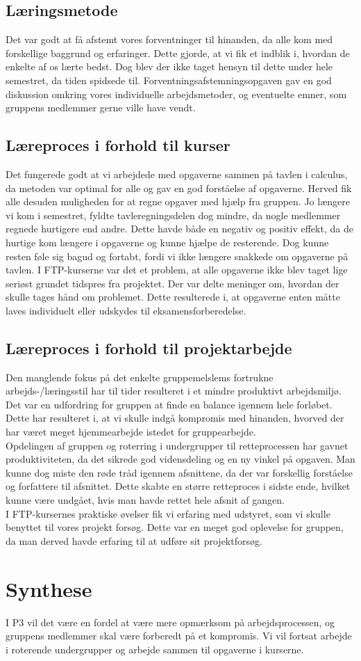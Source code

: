 \subsection{Læringsmetode}
Det var godt at få afstemt vores forventninger til hinanden, da alle kom med forskellige baggrund og erfaringer. Dette gjorde, at vi fik et indblik i, hvordan de enkelte af os lærte bedst. Dog blev der ikke taget hensyn til dette under hele semestret, da tiden spidsede til. Forventningsafstemningsopgaven gav en god diskussion omkring vores individuelle arbejdsmetoder, og eventuelte emner, som gruppens medlemmer gerne ville have vendt.  

\subsection{Læreproces i forhold til kurser}
Det fungerede godt at vi arbejdede med opgaverne sammen på tavlen i calculus, da metoden var optimal for alle og gav en god forståelse af opgaverne. Herved fik alle desuden muligheden for at regne opgaver med hjælp fra gruppen. Jo længere vi kom i semestret, fyldte tavleregningsdelen dog mindre, da nogle medlemmer regnede hurtigere end andre. Dette havde både en negativ og positiv effekt, da de hurtige kom længere i opgaverne og kunne hjælpe de resterende. Dog kunne resten føle sig bagud og fortabt, fordi vi ikke længere snakkede om opgaverne på tavlen. I FTP-kurserne var det et problem, at alle opgaverne ikke blev taget lige seriøst grundet tidspres fra projektet. Der var delte meninger om, hvordan der skulle tages hånd om problemet. Dette resulterede i, at opgaverne enten måtte laves individuelt eller udskydes til eksamensforberedelse.
 
\subsection{Læreproces i forhold til projektarbejde}
Den manglende fokus på det enkelte gruppemelslems fortrukne arbejds-/læringsstil har til tider resulteret i et mindre produktivt arbejdsmiljø. Det var en udfordring for gruppen at finde en balance igennem hele forløbet. Dette har resulteret i, at vi skulle indgå kompromis med hinanden, hvorved der har været meget hjemmearbejde istedet for gruppearbejde. \\
Opdelingen af gruppen og roterring i undergrupper til retteprocessen har gavnet produktiviteten, da det sikrede god vidensdeling og en ny vinkel på opgaven. Man kunne dog miste den røde tråd igennem afsnittene, da der var forskellig forståelse og forfattere til afsnittet. Dette skabte en større retteproces i sidste ende, hvilket kunne være undgået, hvis man havde rettet hele afsnit af gangen. \\
I FTP-kursernes praktiske øvelser fik vi erfaring med udstyret, som vi skulle benyttet til vores projekt forsøg. Dette var en meget god oplevelse for gruppen, da man derved havde erfaring til at udføre sit projektforsøg.

\section{Synthese}
I P$3$ vil det være en fordel at være mere opmærksom på arbejdsprocessen, og gruppens medlemmer skal være forberedt på et kompromis. Vi vil fortsat arbejde i roterende undergrupper og arbejde sammen til opgaverne i kurserne.